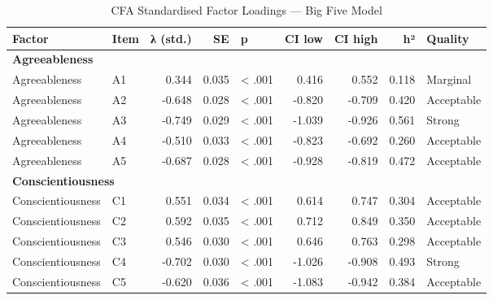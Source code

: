 \documentclass[
]{article}
\begin{document}
\begin{table}
\centering
\caption{\label{tab:cfa-loadings-clean}CFA Standardised Factor Loadings — Big Five Model}
\centering
\begin{tabular}[t]{l|l|r|r|l|r|r|>{}r|l}
\hline
Factor & Item & λ (std.) & SE & p & CI low & CI high & h² & Quality\\
\hline
\multicolumn{9}{l}{\textbf{Agreeableness}}\\
\hline
\hspace{1em}Agreeableness & A1 & 0.344 & 0.035 & < .001 & 0.416 & 0.552 & \textcolor[HTML]{C0392B}{0.118} & Marginal\\
\hline
\hspace{1em}Agreeableness & A2 & -0.648 & 0.028 & < .001 & -0.820 & -0.709 & \textcolor[HTML]{27AE60}{0.420} & Acceptable\\
\hline
\hspace{1em}Agreeableness & A3 & -0.749 & 0.029 & < .001 & -1.039 & -0.926 & \textcolor[HTML]{27AE60}{0.561} & Strong\\
\hline
\hspace{1em}Agreeableness & A4 & -0.510 & 0.033 & < .001 & -0.823 & -0.692 & \textcolor[HTML]{27AE60}{0.260} & Acceptable\\
\hline
\hspace{1em}Agreeableness & A5 & -0.687 & 0.028 & < .001 & -0.928 & -0.819 & \textcolor[HTML]{27AE60}{0.472} & Acceptable\\
\hline
\multicolumn{9}{l}{\textbf{Conscientiousness}}\\
\hline
\hspace{1em}Conscientiousness & C1 & 0.551 & 0.034 & < .001 & 0.614 & 0.747 & \textcolor[HTML]{27AE60}{0.304} & Acceptable\\
\hline
\hspace{1em}Conscientiousness & C2 & 0.592 & 0.035 & < .001 & 0.712 & 0.849 & \textcolor[HTML]{27AE60}{0.350} & Acceptable\\
\hline
\hspace{1em}Conscientiousness & C3 & 0.546 & 0.030 & < .001 & 0.646 & 0.763 & \textcolor[HTML]{27AE60}{0.298} & Acceptable\\
\hline
\hspace{1em}Conscientiousness & C4 & -0.702 & 0.030 & < .001 & -1.026 & -0.908 & \textcolor[HTML]{27AE60}{0.493} & Strong\\
\hline
\hspace{1em}Conscientiousness & C5 & -0.620 & 0.036 & < .001 & -1.083 & -0.942 & \textcolor[HTML]{27AE60}{0.384} & Acceptable\\

\end{tabular}
\end{table}
\end{document}
